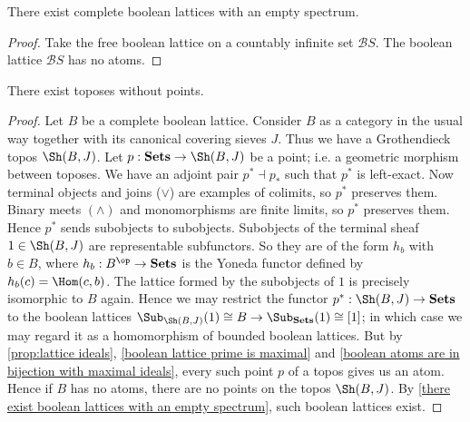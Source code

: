 \begin{corollary}
\label{there exist boolean lattices with an empty spectrum}
There exist complete boolean lattices with an empty spectrum.
\end{corollary}
\begin{proof}
Take the free boolean lattice on a countably infinite set $\mathcal{B}S$. The boolean lattice $\mathcal{B}S$ has no atoms.
\end{proof}

\begin{corollary}
There exist toposes without points.
\end{corollary}
\begin{proof}
Let $B$ be a complete boolean lattice. Consider $B$ as a category in the usual way together with its canonical covering sieves $J$. 
Thus we have a Grothendieck topos $\Sh(B,J)$. Let $p : \mathbf{Sets} \to \Sh(B,J)$ be a point; i.e. a geometric morphism between toposes. 
We have an adjoint pair $p^* \dashv p_*$ such that $p^*$ is left-exact.
Now terminal objects and joins ($\vee$) are examples of colimits, so $p^*$ preserves them.
Binary meets $(\wedge)$ and monomorphisms are finite limits, so $p^*$ preserves them.
Hence $p^*$ sends subobjects to subobjects.
Subobjects of the terminal sheaf $1 \in \Sh(B,J)$ are representable subfunctors. 
So they are of the form $h_b$ with $b \in B$, where $h_b : B^{\op} \to \mathbf{Sets}$ is the Yoneda functor defined by $h_b(c) = \Hom(c,b)$.
The lattice formed by the subobjects of $1$ is precisely isomorphic to $B$ again. 
Hence we may restrict the functor $p^* : \Sh(B,J) \to \mathbf{Sets}$ to the boolean lattices $\Sub_{\Sh(B,J)}(1) \cong B \to \Sub_{\mathbf{Sets}}(1) \cong [1]$; in which case we may regard it as a homomorphism of bounded boolean lattices. But by \cref{prop:lattice ideals}, \cref{boolean lattice prime is maximal} and \cref{boolean atoms are in bijection with maximal ideals}, every such point $p$ of a topos gives us an atom. Hence if $B$ has no atoms, there are no points on the topos $\Sh(B,J)$. By \cref{there exist boolean lattices with an empty spectrum}, such boolean lattices exist.
\end{proof}

